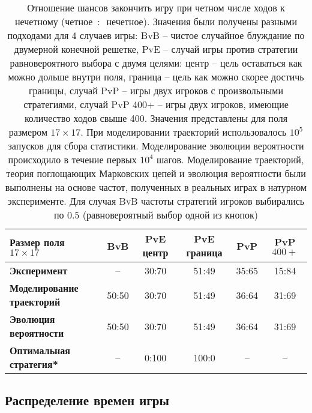 \begin{table}[t]
    \fontsize{10pt}{10pt}\selectfont
    \begin{tabular}{|l|c|c|c|c|c|}
        \toprule
        Размер поля $17 \times 17$ & \textbf{BvB} & \textbf{PvE центр} & \textbf{PvE граница} & \textbf{PvP} & \textbf{PvP $400+$} \\
        \midrule
        \textbf{Эксперимент} & --     & 30:70 & 51:49 & 35:65 & 15:84 \\
        \textbf{Моделирование траекторий} & 50:50 & 30:70 & 51:49 & 36:64 & 31:69 \\
        \textbf{Эволюция вероятности}  & 50:50 & 30:70 & 51:49 & 36:64 & 31:69 \\
        \textbf{Оптимальная стратегия*}    & --     & 0:100 & 100:0 & --   & --     \\
        \bottomrule
    \end{tabular}
    \caption{
        Отношение шансов закончить игру при четном числе ходов к нечетному (четное~$:$~нечетное). Значения были получены разными подходами для 4 случаев игры: BvB -- чистое случайное блуждание по двумерной конечной решетке, PvE -- случай игры против стратегии равновероятного выбора с двумя целями: центр -- цель оставаться как можно дольше внутри поля, граница -- цель как можно скорее достичь границы, случай PvP -- игры двух игроков с произвольными стратегиями, случай PvP 400+ -- игры двух игроков, имеющие количество ходов свыше 400. Значения представлены для поля размером $17 \times 17$. При моделировании траекторий использовалось $10^5$ запусков для сбора статистики. Моделирование эволюции вероятности происходило в течение первых $10^4$ шагов. Моделирование траекторий, теория поглощающих Марковских цепей и эволюция вероятности были выполнены на основе частот, полученных в реальных играх в натурном эксперименте. Для случая BvB частоты стратегий игроков выбирались по $0.5$ (равновероятный выбор одной из кнопок)
    }
    \label{tab:parity}
\end{table}

\subsection{Распределение времен игры}\label{subsec:ch3/sec4/sub3}


